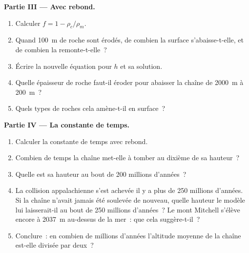 \begin{problem}
\medskip
\noindent\textbf{Partie III --- Avec rebond.}
\begin{enumerate}[resume]
  \item Calculer $f = 1 - \rho_c/\rho_m$.
  \item Quand \qty{100}{m} de roche sont érodés, de combien la surface
        s'abaisse-t-elle, et de combien la  remonte-t-elle~?
  \item Écrire la nouvelle équation pour $h$ et sa solution.
  \item Quelle épaisseur de roche faut-il éroder pour abaisser la chaîne de
        \qty{2000}{m} à \qty{200}{m}~?
  \item Quels types de roches cela amène-t-il en surface~?
\end{enumerate}

\medskip
\noindent\textbf{Partie IV --- La constante de temps.}
\begin{enumerate}[resume]
  \item Calculer la constante de temps avec rebond.
  \item Combien de temps la chaîne met-elle à tomber au dixième de sa
        hauteur~?
  \item Quelle est sa hauteur au bout de 200 millions d'années~?
  \item La collision appalachienne s'est achevée il y a plus de 250
        millions d'années. Si la chaîne n'avait jamais été soulevée de
        nouveau, quelle hauteur le modèle lui laisserait-il au bout de 250
        millions d'années~? Le mont Mitchell s'élève encore à
        \qty{2037}{m} au-dessus de la mer~: que cela suggère-t-il~?
  \item Conclure~: en combien de millions d'années l'altitude moyenne de la
        chaîne est-elle divisée par deux~?
\end{enumerate}
\end{problem}
